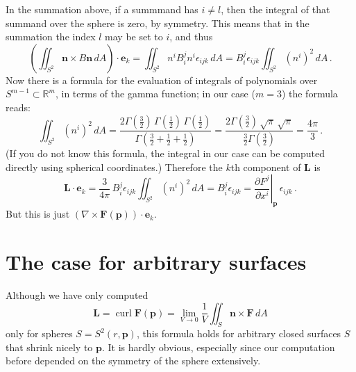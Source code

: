 \documentclass[12pt]{article}
\newcommand{\real}{\mathbb{R}}
\newcommand{\ve}{\mathbf{e}}
\newcommand{\vF}{\mathbf{F}}
\newcommand{\vL}{\mathbf{L}}
\newcommand{\vn}{\mathbf{n}}
\newcommand{\vp}{\mathbf{p}}
\newcommand{\cross}{\times}
\DeclareMathOperator{\curl}{curl}
\begin{document}
In the summation above, if a summmand has $i \neq l$,
 then the integral of that summand over the sphere is zero, by symmetry.
This means that in the summation the index $l$ may be set to $i$,
and thus
\[
\left(\iint_{S^2} \vn \cross B\vn \, dA \right) \cdot \ve_k 
= \iint_{S^2} n^i B_i^j n^i \epsilon_{ijk} \, dA
= B_i^j \epsilon_{ijk} \iint_{S^2} (n^i)^2 \, dA\,.
\]
Now there is a formula for the evaluation of integrals 
of polynomials over $S^{m-1} \subset \real^m$, in terms of the gamma function;
in our case ($m = 3$) the formula reads:
\[
\iint_{S^2} (n^i)^2 \, dA = \frac{2 \Gamma(\frac{3}{2}) \, \Gamma(\frac{1}{2})
\, \Gamma(\frac{1}{2})}{\Gamma(\frac{3}{2} + \frac{1}{2} + \frac{1}{2})}
= \frac{2 \Gamma(\frac{3}{2}) \, \sqrt{\pi} \, \sqrt{\pi}}{\frac{3}{2} \Gamma(\frac{3}{2})}
= \frac{4\pi}{3}\,.
\]
(If you do not know this formula, the integral in our case
can be computed directly using spherical coordinates.)
Therefore the $k$th component of $\vL$ is
\[
\vL \cdot \ve_k = \frac{3}{4\pi} \, B_i^j \epsilon_{ijk} \iint_{S^2} (n^i)^2 \, dA
= B_i^j \epsilon_{ijk} = \left.\frac{\partial F^j}{\partial x^i}\right|_\vp \, \epsilon_{ijk}\,.
\]
But this is just $(\nabla \cross \vF(\vp)) \cdot \ve_k$.


\section*{The case for arbitrary surfaces}
Although we have only
computed
\[
\vL = \curl \vF(\vp) = \lim_{V \to 0} \frac{1}{V} \iint_S \vn \cross \vF \, dA
\]
only for spheres $S = S^2(r, \vp)$,
this formula holds for arbitrary closed surfaces $S$ that shrink nicely to $\vp$.
It is hardly obvious, especially since our computation before depended
on the symmetry of the sphere extensively.
\end{document}
